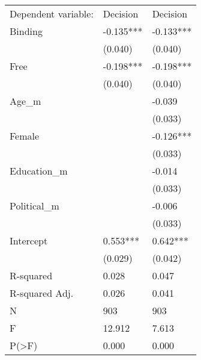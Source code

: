 \begin{tabular}{lll}
Dependent variable: & Decision & Decision \\
Binding & -0.135*** & -0.133*** \\
 & (0.040) & (0.040) \\
Free & -0.198*** & -0.198*** \\
 & (0.040) & (0.040) \\
Age_m &  & -0.039 \\
 &  & (0.033) \\
Female &  & -0.126*** \\
 &  & (0.033) \\
Education_m &  & -0.014 \\
 &  & (0.033) \\
Political_m &  & -0.006 \\
 &  & (0.033) \\
Intercept & 0.553*** & 0.642*** \\
 & (0.029) & (0.042) \\
R-squared & 0.028 & 0.047 \\
R-squared Adj. & 0.026 & 0.041 \\
N & 903 & 903 \\
F & 12.912 & 7.613 \\
P(>F) & 0.000 & 0.000 \\
\end{tabular}
